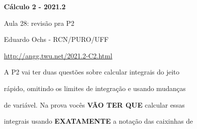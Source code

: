 \documentclass[oneside,12pt]{article}
\begin{document}
%



\def\u#1{\par{\footnotesize \url{#1}}}

\def\drafturl{http://angg.twu.net/LATEX/2021-2-C2.pdf}
\def\drafturl{http://angg.twu.net/2021.2-C2.html}
\def\draftfooter{\tiny \href{\drafturl}{\jobname{}} \ColorBrown{\shorttoday{} \hours}}



%

\thispagestyle{empty}

\begin{center}

\vspace*{1.2cm}

{\bf \Large Cálculo 2 - 2021.2}

\bsk

Aula 28: revisão pra P2

\bsk

Eduardo Ochs - RCN/PURO/UFF

\url{http://angg.twu.net/2021.2-C2.html}

\end{center}

\newpage

A P2 vai ter duas questões sobre calcular integrais do jeito

rápido, omitindo os limites de integração e usando mudanças

de variável. Na prova vocês {\bf VÃO TER QUE} calcular essas

integrais usando {\bf EXATAMENTE} a notação das caixinhas de
\end{document}
